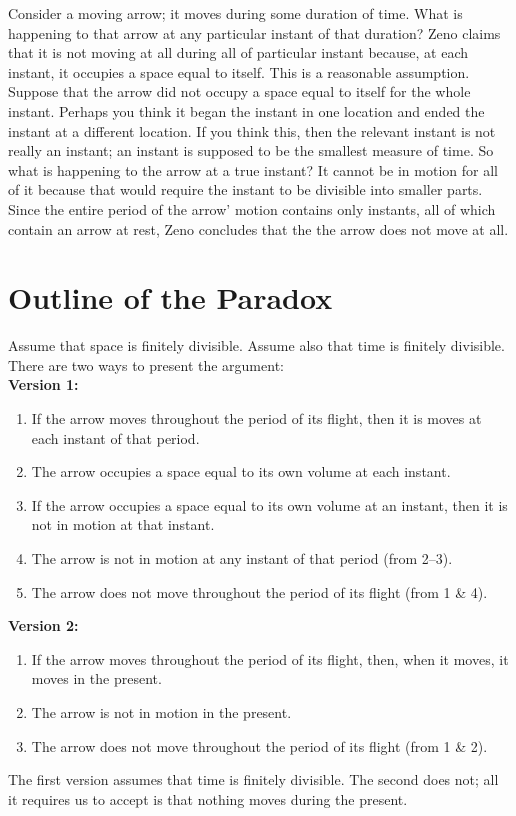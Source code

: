 \documentclass[oneside]{article}
\begin{document}
Consider a moving arrow; it moves during some duration of time. What is happening to that arrow at any particular instant of that duration? Zeno claims that it is not moving at all during all of particular instant because, at each instant, it occupies a space equal to itself. This is a reasonable assumption. Suppose that the arrow did not occupy a space equal to itself for the whole instant. Perhaps you think it began the instant in one location and ended the instant at a different location. If you think this, then the relevant instant is not really an instant; an instant is supposed to be the smallest measure of time. So what is happening to the arrow at a true instant? It cannot be in motion for all of it because that would require the instant to be divisible into smaller parts.   Since the entire period of the arrow' motion contains only instants, all of which contain an arrow at rest, Zeno concludes that the the arrow does not move at all.

\section*{Outline of the Paradox}\label{outline-of-the-paradox}

Assume that space is finitely divisible. Assume also that time is finitely divisible. There are two ways to present the argument:\\

\noindent \textbf{Version 1:}\begin{enumerate}
\item If the arrow moves throughout the period of its flight, then it is moves at each instant of that period. 
\item The arrow occupies a space equal to its own volume at each instant. 
\item If the arrow occupies a space equal to its own volume at an instant, then it is not in motion at that instant. 
\item The arrow is not in motion at any instant of that period (from 2--3).
\item The arrow does not move throughout the period of its flight (from 1 \& 4).\\
\end{enumerate}
\noindent \textbf{Version 2:}
\begin{enumerate}
\item If the arrow moves throughout the period of its flight, then, when it moves, it moves in the present. 
\item The arrow is not in motion in the present. 
\item The arrow does not move throughout the period of its flight (from 1 \& 2). 
\end{enumerate}
The first version assumes that time is finitely divisible. The second  does not; all it requires us to accept is that nothing moves during the present. 
\end{document}

